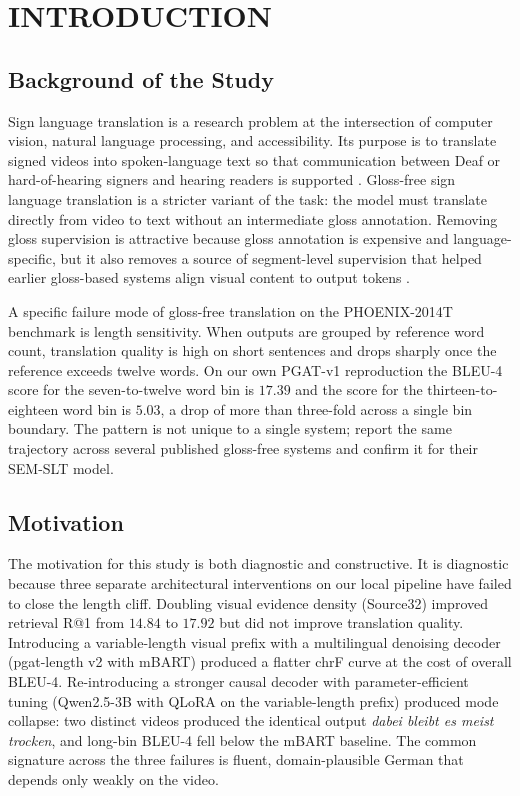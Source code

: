 \chapter{INTRODUCTION}

\section{Background of the Study}

Sign language translation is a research problem at the intersection of computer vision, natural language processing, and accessibility. Its purpose is to translate signed videos into spoken-language text so that communication between Deaf or hard-of-hearing signers and hearing readers is supported \citep{camgoz2018neural,camgoz2020sign}. Gloss-free sign language translation is a stricter variant of the task: the model must translate directly from video to text without an intermediate gloss annotation. Removing gloss supervision is attractive because gloss annotation is expensive and language-specific, but it also removes a source of segment-level supervision that helped earlier gloss-based systems align visual content to output tokens \citep{zhou2023gloss}.

A specific failure mode of gloss-free translation on the PHOENIX-2014T benchmark is length sensitivity. When outputs are grouped by reference word count, translation quality is high on short sentences and drops sharply once the reference exceeds twelve words. On our own PGAT-v1 reproduction the BLEU-4 score for the seven-to-twelve word bin is $17.39$ and the score for the thirteen-to-eighteen word bin is $5.03$, a drop of more than three-fold across a single bin boundary. The pattern is not unique to a single system; \citet{yazdani2026length} report the same trajectory across several published gloss-free systems and \citet{hamidullah2024sem} confirm it for their SEM-SLT model.

\section{Motivation}

The motivation for this study is both diagnostic and constructive. It is diagnostic because three separate architectural interventions on our local pipeline have failed to close the length cliff. Doubling visual evidence density (Source32) improved retrieval R@1 from $14.84$ to $17.92$ but did not improve translation quality. Introducing a variable-length visual prefix with a multilingual denoising decoder (pgat-length v2 with mBART) produced a flatter chrF curve at the cost of overall BLEU-4. Re-introducing a stronger causal decoder with parameter-efficient tuning (Qwen2.5-3B with QLoRA on the variable-length prefix) produced mode collapse: two distinct videos produced the identical output \emph{dabei bleibt es meist trocken}, and long-bin BLEU-4 fell below the mBART baseline. The common signature across the three failures is fluent, domain-plausible German that depends only weakly on the video.

